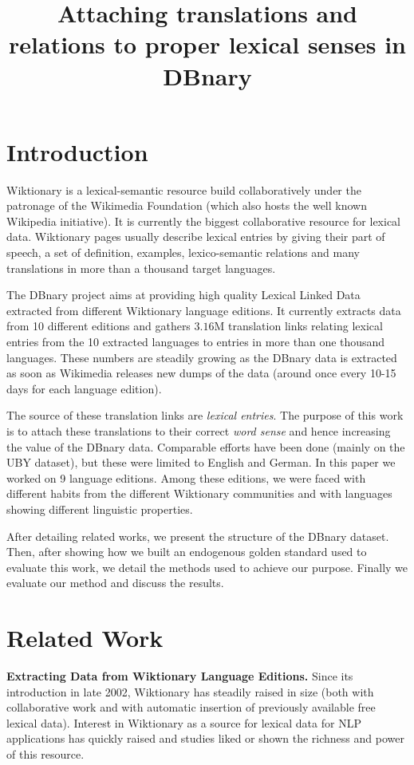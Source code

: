 \documentclass[10pt, a4paper]{article}
\title{Attaching translations and relations to proper lexical senses in DBnary}
\begin{document}
\maketitleabstract

\section{Introduction}

 Wiktionary is a lexical-semantic resource build collaboratively under the patronage of the Wikimedia Foundation (which also hosts the well known Wikipedia initiative). It is currently the biggest collaborative resource for lexical data. Wiktionary pages usually describe lexical entries by giving their part of speech, a set of definition, examples, lexico-semantic relations and many translations in more than a thousand target languages.

The DBnary project \cite{serasset:dbnary-swj} aims at providing high quality Lexical Linked Data extracted from different Wiktionary language editions. It currently extracts data from 10 different editions and gathers $3.16$M translation links relating lexical entries from the 10 extracted languages to entries in more than one thousand languages. These numbers are steadily growing as the DBnary data is extracted as soon as Wikimedia releases new dumps of the data (around once every 10-15 days for each language edition).

The source of these translation links are \emph{lexical entries}. The purpose of this work is to attach these translations to their correct \emph{word sense} and hence increasing the value of the DBnary data. Comparable efforts have been done (mainly on the UBY dataset), but these were limited to English and German. In this paper we worked on 9 language editions. Among these editions, we were faced with different habits from the different Wiktionary communities and with languages showing different linguistic properties. 

After detailing related works, we present the structure of the DBnary dataset. Then, after showing how we built an endogenous golden standard used to evaluate this work, we detail the methods used to achieve our purpose. Finally we evaluate our method and discuss the results.

\section{Related Work}

\textbf{Extracting Data from Wiktionary Language Editions.} Since its introduction in late 2002, Wiktionary has steadily raised in size (both with collaborative work and with automatic insertion of previously available free lexical data). Interest in Wiktionary as a source for lexical data for NLP applications has quickly raised and studies liked \cite{Zesch:AAAI2008} or \cite{navarro-EtAl:2009:PeoplesWeb} shown the richness and power of this resource. 
\end{document}
